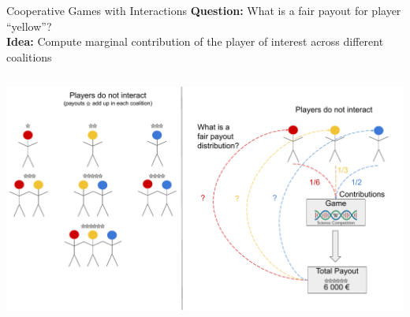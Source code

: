 \documentclass[11pt,compress,t,notes=noshow, aspectratio=169, xcolor=table]{beamer}
\begin{document}
\begin{frame}{Cooperative Games with Interactions}
\textbf{Question:} What is a fair payout for player \enquote{yellow}?\\
\textbf{Idea:} Compute marginal contribution of the player of interest across different coalitions

\begin{columns}[T, totalwidth=\linewidth]
\begin{column}{0.53\textwidth}
\includegraphics[page=4, trim=150px 120px 160px 10px, clip]{figure/Shapley.pdf}


\end{column}
\end{columns}
\end{frame}
\end{document}
